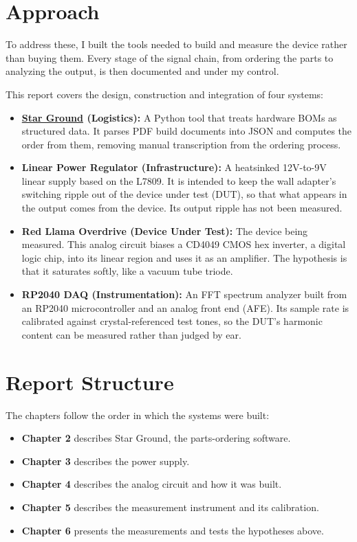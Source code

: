 \documentclass[11pt, a4paper]{report}
\begin{document}
\section{Approach}
To address these, I built the tools needed to build and measure the device rather than buying them. Every stage of the signal chain, from ordering the parts to analyzing the output, is then documented and under my control.

This report covers the design, construction and integration of four systems:

\begin{itemize}
  \item \textbf{\href{https://github.com/JacksonFergusonDev/star-ground}{Star Ground} (Logistics):} A Python tool that treats hardware BOMs as structured data. It parses PDF build documents into JSON and computes the order from them, removing manual transcription from the ordering process.

  \item \textbf{Linear Power Regulator (Infrastructure):} A heatsinked 12V-to-9V linear supply based on the L7809. It is intended to keep the wall adapter's switching ripple out of the device under test (DUT), so that what appears in the output comes from the device. Its output ripple has not been measured.

  \item \textbf{Red Llama Overdrive (Device Under Test):} The device being measured. This analog circuit biases a CD4049 CMOS hex inverter, a digital logic chip, into its linear region and uses it as an amplifier. The hypothesis is that it saturates softly, like a vacuum tube triode.

  \item \textbf{RP2040 DAQ (Instrumentation):} An FFT spectrum analyzer built from an RP2040 microcontroller and an analog front end (AFE). Its sample rate is calibrated against crystal-referenced test tones, so the DUT's harmonic content can be measured rather than judged by ear.
\end{itemize}

\section{Report Structure}
The chapters follow the order in which the systems were built:
\begin{itemize}
  \item \textbf{Chapter 2} describes Star Ground, the parts-ordering software.
  \item \textbf{Chapter 3} describes the power supply.
  \item \textbf{Chapter 4} describes the analog circuit and how it was built.
  \item \textbf{Chapter 5} describes the measurement instrument and its calibration.
  \item \textbf{Chapter 6} presents the measurements and tests the hypotheses above.
\end{itemize}
\end{document}
